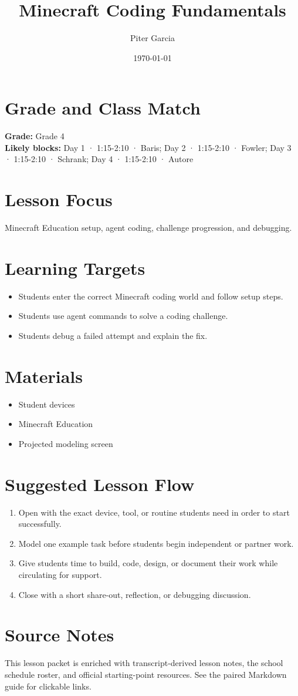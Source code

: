 \documentclass[11pt]{article}
\title{Minecraft Coding Fundamentals}
\author{Piter Garcia}
\date{\today}
\begin{document}
\maketitle

\section*{Grade and Class Match}
\textbf{Grade:} Grade 4\\
\textbf{Likely blocks:} Day 1 · 1:15-2:10 · Baris; Day 2 · 1:15-2:10 · Fowler; Day 3 · 1:15-2:10 · Schrank; Day 4 · 1:15-2:10 · Autore

\section*{Lesson Focus}
Minecraft Education setup, agent coding, challenge progression, and debugging.

\section*{Learning Targets}
\begin{itemize}[leftmargin=*]
\item Students enter the correct Minecraft coding world and follow setup steps.
\item Students use agent commands to solve a coding challenge.
\item Students debug a failed attempt and explain the fix.
\end{itemize}

\section*{Materials}
\begin{itemize}[leftmargin=*]
\item Student devices
\item Minecraft Education
\item Projected modeling screen
\end{itemize}

\section*{Suggested Lesson Flow}
\begin{enumerate}[leftmargin=*]
\item Open with the exact device, tool, or routine students need in order to start successfully.
\item Model one example task before students begin independent or partner work.
\item Give students time to build, code, design, or document their work while circulating for support.
\item Close with a short share-out, reflection, or debugging discussion.
\end{enumerate}

\section*{Source Notes}
This lesson packet is enriched with transcript-derived lesson notes, the school schedule roster, and official starting-point resources. See the paired Markdown guide for clickable links.



\end{document}
